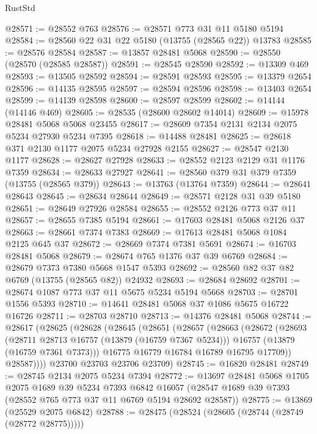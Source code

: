 \begin{lexlean}{RustStd}
\begin{coremodule}
@28571 := @28552 @763
@28576 := @28571 @773 @31 @11 @5180 @5194
@28584 := @28560 @22 @31 @22 @5180 (@13755 (@28565 @22)) @13783
@28585 := @28576 @28584
@28587 := @13857 @28481 @5068
@28590 := @28550 (@28570 (@28585 @28587))
@28591 := @28545 @28590
@28592 := @13309 @469
@28593 := @13505 @28592
@28594 := @28591 @28593
@28595 := @13379 @2654
@28596 := @14135 @28595
@28597 := @28594 @28596
@28598 := @13403 @2654
@28599 := @14139 @28598
@28600 := @28597 @28599
@28602 := @14144 (@14146 @469)
@28605 := @28535 (@28600 @28602 @14014)
@28609 := @15978 @28481 @5068 @5068 @23455
@28617 := @28609 @7354 @2131 @2134 @2075 @5234 @27930 @5234 @7395
@28618 := @14488 @28481
@28625 := @28618 @371 @2130 @1177 @2075 @5234 @27928 @2155
@28627 := @28547 @2130 @1177
@28628 := @28627 @27928
@28633 := @28552 @2123 @2129 @31 @1176 @7359
@28634 := @28633 @27927
@28641 := @28560 @379 @31 @379 @7359 (@13755 (@28565 @379))
@28643 := @13763 (@13764 @7359)
@28644 := @28641 @28643
@28645 := @28634 @28644
@28649 := @28571 @2128 @31 @39 @5180
@28651 := @28649 @27926 @28584
@28655 := @28552 @2126 @773 @37 @11
@28657 := @28655 @7385 @5194
@28661 := @17603 @28481 @5068 @2126 @37
@28663 := @28661 @7374 @7383
@28669 := @17613 @28481 @5068 @1084 @2125 @645 @37
@28672 := @28669 @7374 @7381 @5691
@28674 := @16703 @28481 @5068
@28679 := @28674 @765 @1376 @37 @39 @6769
@28684 := @28679 @7373 @7380 @5668 @1547 @5393
@28692 := @28560 @82 @37 @82 @6769 (@13755 (@28565 @82)) @24932
@28693 := @28684 @28692
@28701 := @28674 @1087 @773 @37 @11 @5675 @5234 @5194 @5668
@28703 := @28701 @1556 @5393
@28710 := @14641 @28481 @5068 @37 @1086 @5675 @16722 @16726
@28711 := @28703 @28710
@28713 := @14376 @28481 @5068
@28744 := @28617
    (@28625
      (@28628
        (@28645
          (@28651
            (@28657
              (@28663
                (@28672
                  (@28693
                    (@28711 @28713 @16757 (@13879 (@16759 @7367 @5234)))
                    @16757
                    (@13879 (@16759 @7361 @7373)))
                  @16775
                  @16779
                  @16784
                  @16789
                  @16795
                  @17709))
              @28587))))
      @23700
      @23703
      @23706
      @23709)
@28745 := @16820 @28481
@28749 := @28745 @2134 @2075 @5234 @7394
@28772 := @13697
    @28481
    @5068
    @1705
    @2075
    @1689
    @39
    @5234
    @7393
    @6842
    @16057
    (@28547 @1689 @39 @7393 (@28552 @765 @773 @37 @11 @6769 @5194 @28692 @28587))
@28775 := @13869 (@25529 @2075 @6842)
@28788 := @28475
    (@28524 (@28605 (@28744 (@28749 (@28772 @28775)))))

\end{coremodule}
\end{lexlean}
